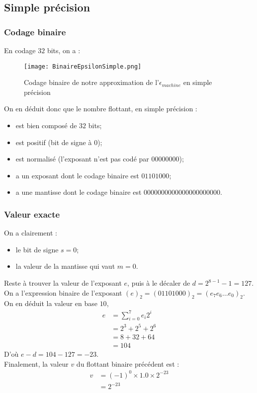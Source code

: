 \documentclass[a4paper, titlepage]{livret} %
\begin{document}
			\subsection{Simple précision}
				\subsubsection{Codage binaire}
					En codage $32$ bits, on a :
					\begin{figure}[!h]
						\centering
  							\texttt{[image: BinaireEpsilonSimple.png]}
  							\caption{Codage binaire de notre approximation de l'$\epsilon_{machine}$ en simple précision}
					\end{figure}

					On en déduit donc que le nombre flottant, en simple précision :
					\begin{itemize}
						\item est bien composé de $32$ bits;
						\item est positif (bit de signe à 0);
						\item est normalisé (l'exposant n'est pas codé par $00000000$);
						\item a un exposant dont le codage binaire est $01101000$;
						\item a une mantisse dont le codage binaire est $00000000 00000000 000000$.
					\end{itemize}

				\subsubsection{Valeur exacte}
					On a clairement : 
					\begin{itemize}
						\item le bit de signe $s = 0$;
						\item la valeur de la mantisse qui vaut $m = 0$.
					\end{itemize}
					Reste à trouver la valeur de l'exposant $e$, puis à le décaler de $d = 2^{8-1}-1 = 127$.
					On a l'expression binaire de l'exposant $(e)_{2} = (01101000)_{2} = (e_{7}e_{6}…e_{0})_{2}$.\\
					On en déduit la valeur en base $10$, 
					\[\begin{aligned}
						e & = \sum_{i=0}^{7} e_{i}2^{i}\\
						  & = 2^{3} + 2^{5} + 2^{6}\\
						  & = 8 + 32 + 64\\
						  & = 104
					\end{aligned}\]
					D'où $e-d = 104 - 127 = -23$.\\
					Finalement, la valeur $v$ du flottant binaire précédent est :
					\[\begin{aligned}
						v & = (-1)^{0} \times 1.0 \times 2^{-23}\\
						  & = 2^{-23}
					\end{aligned}\]
\end{document}
